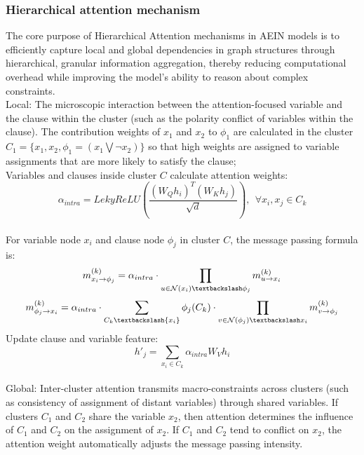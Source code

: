 \subsubsection{Hierarchical attention mechanism}
The core purpose of Hierarchical Attention mechanisms in AEIN models is to efficiently capture local and global dependencies in graph structures through hierarchical, granular information aggregation, thereby reducing computational overhead while improving the model's ability to reason about complex constraints.\\
Local: The microscopic interaction between the attention-focused variable and the clause within the cluster (such as the polarity conflict of variables within the clause).
The contribution weights of \(x_1\) and \(x_2\) to \(\phi_1\) are calculated in the cluster \(C_1=\{x_1,x_2,\phi_1=(x_1\bigvee ¬x_2)\}\) so that high weights are assigned to variable assignments that are more likely to satisfy the clause;\\
Variables and clauses inside cluster \(C\) calculate attention weights:\\
\begin{equation}
\alpha_{intra}=LekyReLU(\frac{(W_Qh_i)^T(W_Kh_j)}{\sqrt{d}}),\ \ \forall x_i,x_j\in C_k
\end{equation}\\
For variable node \(x_i\) and clause node \(\phi_j\) in cluster \(C\), the message passing formula is:
\begin{equation}
    m_{x_i\rightarrow \phi_j}^{(k)}=\alpha_{intra}\cdot \prod_{u\in \mathcal N(x_i)\textbackslash \phi_j}m_{u\rightarrow x_i}^{(k)}
\end{equation}
\begin{equation}
     m_{\phi_j\rightarrow x_i}^{(k)}=\alpha_{intra}\cdot\sum_{C_k \textbackslash \{x_i\}}\phi_j(C_k)\cdot\prod_{v\in \mathcal{N}(\phi_j)\textbackslash x_i}m_{v\rightarrow \phi_j}^{(k)}
\end{equation}
Update clause and variable feature:\\
\begin{equation}
h'_j=\sum_{x_i\in C_k}\alpha_{intra}W_Vh_i
\end{equation}\\
Global: Inter-cluster attention transmits macro-constraints across clusters (such as consistency of assignment of distant variables) through shared variables.
If clusters \(C_1\) and \(C_2\) share the variable \(x_2\), then attention determines the influence of \(C_1\) and \(C_2\) on the assignment of \(x_2\). If \(C_1\) and \(C_2\) tend to conflict on \(x_2\), the attention weight automatically adjusts the message passing intensity.
